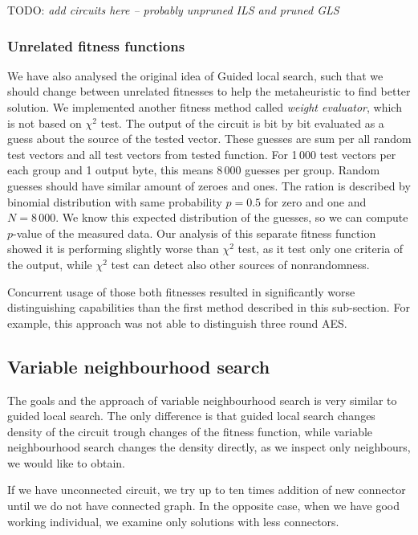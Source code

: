\documentclass[
  print, %
  Table,   %
  nolof,     %
  nolot,     %
  11pt, %
  oneside  %
]{fithesis3}
\newcommand{\todo}[1]{TODO: \textit{#1}}
\begin{document}
\todo{add circuits here -- probably unpruned ILS and pruned GLS}

\subsubsection{Unrelated fitness functions}

We have also analysed the original idea of Guided local search, such that we should change between unrelated fitnesses to help the metaheuristic to find better solution. We implemented another fitness method called \textit{weight evaluator}, which is not based on $\chi^{2}$ test. The output of the circuit is bit by bit evaluated as a guess about the source of the tested vector. These guesses are sum per all random test vectors and all test vectors from tested function. For 1\,000 test vectors per each group and 1 output byte, this means 8\,000 guesses per group. Random guesses should have similar amount of zeroes and ones. The ration is described by binomial distribution with same probability $p = 0.5$ for zero and one and $N = 8\,000$. We know this expected distribution of the guesses, so we can compute $p$-value of the measured data. Our analysis of this separate fitness function showed it is performing slightly worse than $\chi^{2}$ test, as it test only one criteria of the output, while $\chi^{2}$ test can detect also other sources of nonrandomness.

Concurrent usage of those both fitnesses resulted in significantly worse distinguishing capabilities than the first method described in this sub-section. For example, this approach was not able to distinguish three round AES.


\subsection{Variable neighbourhood search}
\label{subsec:res-ss-vns}

The goals and the approach of variable neighbourhood search is very similar to guided local search. The only difference is that guided local search changes density of the circuit trough changes of the fitness function, while variable neighbourhood search changes the density directly, as we inspect only neighbours, we would like to obtain.

If we have unconnected circuit, we try up to ten times addition of new connector until we do not have connected graph. In the opposite case, when we have good working individual, we examine only solutions with less connectors.
\end{document}
